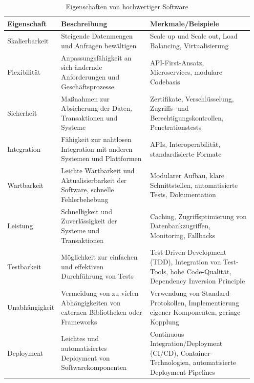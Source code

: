 \documentclass[notitlepage, hidelinks]{article}
\begin{document}
\begin{table}[ht]
\centering
\begin{tabular}{|l|p{6cm}|p{6cm}|}
\hline
\textbf{Eigenschaft} & \textbf{Beschreibung} & \textbf{Merkmale/Beispiele} \\
\hline
Skalierbarkeit & Steigende Datenmengen und Anfragen bewältigen & Scale up und Scale out, Load Balancing, Virtualisierung \\ \hline
Flexibilität & Anpassungsfähigkeit an sich ändernde Anforderungen und Geschäftsprozesse & API-First-Ansatz, Microservices, modulare Codebasis \\ \hline
Sicherheit & Maßnahmen zur Absicherung der Daten, Transaktionen und Systeme & Zertifikate, Verschlüsselung, Zugriffs- und Berechtigungskontrollen, Penetrationstests \\ \hline
Integration & Fähigkeit zur nahtlosen Integration mit anderen Systemen und Plattformen & APIs, Interoperabilität, standardisierte Formate \\ \hline
Wartbarkeit & Leichte Wartbarkeit und Aktualisierbarkeit der Software, schnelle Fehlerbehebung & Modularer Aufbau, klare Schnittstellen, automatisierte Tests, Dokumentation \\ \hline
Leistung & Schnelligkeit und Zuverlässigkeit der Systeme und Transaktionen & Caching, Zugriffsptimierung von Datenbankzugriffen, Monitoring, Fallbacks \\ \hline
Testbarkeit & Möglichkeit zur einfachen und effektiven Durchführung von Tests & Test-Driven-Development (TDD), Integration von Test-Tools, hohe Code-Qualität, Dependency Inversion Principle \\ \hline
Unabhängigkeit & Vermeidung von zu vielen Abhängigkeiten von externen Bibliotheken oder Frameworks & Verwendung von Standard-Protokollen, Implementierung eigener Komponenten, geringe Kopplung \\ \hline
Deployment & Leichtes und automatisiertes Deployment von Softwarekomponenten & Continuous Integration/Deployment (CI/CD), Container-Technologien, automatisierte Deployment-Pipelines \\ \hline
\end{tabular}
\caption{Eigenschaften von hochwertiger Software}
\label{table:software-qualities}
\end{table}
\end{document}

